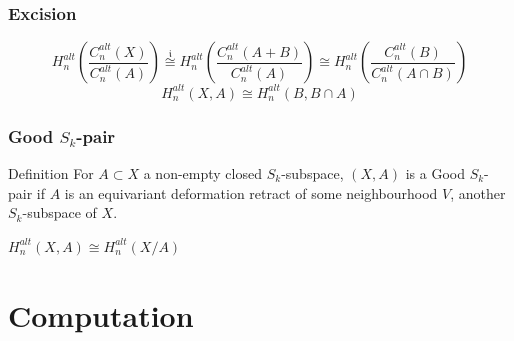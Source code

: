 \documentclass{beamer}[10pt]
\theoremstyle{definition}
\begin{document}
\begin{frame}
\frametitle{Excision}
\centering
$$H^{alt}_n(\frac{C^{alt}_n(X)}{C^{alt}_n(A)})\overset{\mathfrak{i}}\cong H^{alt}_n(\frac{C^{alt}_n(A+B)}{C^{alt}_n(A)})\cong H^{alt}_n(\frac{C^{alt}_n(B)}{C^{alt}_n(A\cap B)})$$
$$H^{alt}_n(X,A)\cong H^{alt}_n(B,B\cap A)$$
\end{frame}



\begin{frame}
\frametitle{Good $S_k$-pair}
\centering
\begin{block}{Definition}
For $A\subset X$ a non-empty closed $S_k$-subspace, $(X,A)$ is a Good $S_k$-pair if $A$ is an equivariant deformation retract of some neighbourhood $V$, another $S_k$-subspace of $X$.
\end{block}
$H^{alt}_n(X,A)\cong H^{alt}_n(X/A)$
\end{frame}



\section{Computation}
\end{document}
